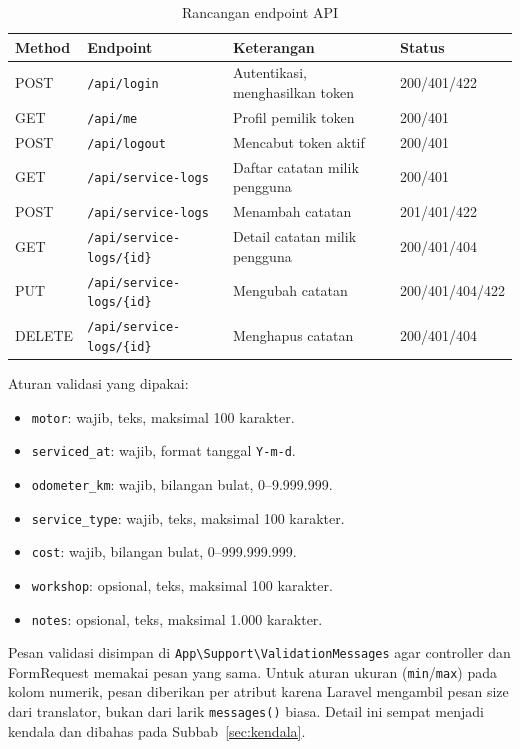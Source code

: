 \documentclass[12pt,a4paper,oneside]{book}
\begin{document}
\begin{table}[H]
\centering
\caption{Rancangan endpoint API}
\label{tab:api}
\small
\begin{tabularx}{\textwidth}{@{}l l X l@{}}
\toprule
\textbf{Method} & \textbf{Endpoint} & \textbf{Keterangan} & \textbf{Status} \\
\midrule
POST & \texttt{/api/login} & Autentikasi, menghasilkan token & 200/401/422 \\
GET & \texttt{/api/me} & Profil pemilik token & 200/401 \\
POST & \texttt{/api/logout} & Mencabut token aktif & 200/401 \\
GET & \texttt{/api/service-logs} & Daftar catatan milik pengguna & 200/401 \\
POST & \texttt{/api/service-logs} & Menambah catatan & 201/401/422 \\
GET & \texttt{/api/service-logs/\{id\}} & Detail catatan milik pengguna & 200/401/404 \\
PUT & \texttt{/api/service-logs/\{id\}} & Mengubah catatan & 200/401/404/422 \\
DELETE & \texttt{/api/service-logs/\{id\}} & Menghapus catatan & 200/401/404 \\
\bottomrule
\end{tabularx}
\end{table}

Aturan validasi yang dipakai:

\begin{itemize}[leftmargin=1.2cm]
  \item \texttt{motor}: wajib, teks, maksimal 100 karakter.
  \item \texttt{serviced\_at}: wajib, format tanggal \texttt{Y-m-d}.
  \item \texttt{odometer\_km}: wajib, bilangan bulat, 0--9.999.999.
  \item \texttt{service\_type}: wajib, teks, maksimal 100 karakter.
  \item \texttt{cost}: wajib, bilangan bulat, 0--999.999.999.
  \item \texttt{workshop}: opsional, teks, maksimal 100 karakter.
  \item \texttt{notes}: opsional, teks, maksimal 1.000 karakter.
\end{itemize}

Pesan validasi disimpan di \texttt{App\textbackslash Support\textbackslash ValidationMessages}
agar controller dan FormRequest memakai pesan yang sama. Untuk aturan ukuran
(\texttt{min}/\texttt{max}) pada kolom numerik, pesan diberikan per atribut karena
Laravel mengambil pesan size dari translator, bukan dari larik \texttt{messages()}
biasa. Detail ini sempat menjadi kendala dan dibahas pada Subbab~\ref{sec:kendala}.
\end{document}
